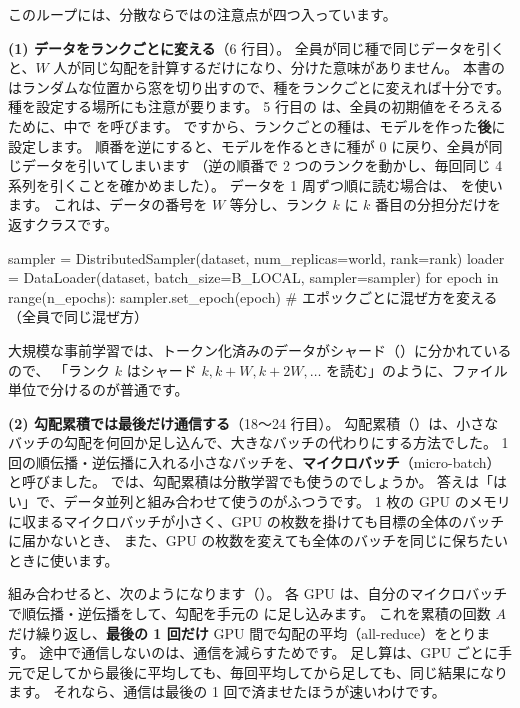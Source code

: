 このループには、分散ならではの注意点が四つ入っています。

\textbf{(1) データをランクごとに変える}（6 行目）。
全員が同じ種で同じデータを引くと、$W$ 人が同じ勾配を計算するだけになり、分けた意味がありません。
本書の  はランダムな位置から窓を切り出すので、種をランクごとに変えれば十分です。
種を設定する場所にも注意が要ります。
5 行目の  は、全員の初期値をそろえるために、中で  を呼びます。
ですから、ランクごとの種は、モデルを作った\textbf{後}に設定します。
順番を逆にすると、モデルを作るときに種が 0 に戻り、全員が同じデータを引いてしまいます
（逆の順番で 2 つのランクを動かし、毎回同じ 4 系列を引くことを確かめました）。
データを 1 周ずつ順に読む場合は、 を使います。
これは、データの番号を $W$ 等分し、ランク $k$ に $k$ 番目の分担分だけを返すクラスです。
\begin{pycode}
sampler = DistributedSampler(dataset, num_replicas=world, rank=rank)
loader = DataLoader(dataset, batch_size=B_LOCAL, sampler=sampler)
for epoch in range(n_epochs):
    sampler.set_epoch(epoch)   # エポックごとに混ぜ方を変える（全員で同じ混ぜ方）
\end{pycode}
大規模な事前学習では、トークン化済みのデータがシャード（）に分かれているので、
「ランク $k$ はシャード $k, k+W, k+2W,\dots$ を読む」のように、ファイル単位で分けるのが普通です。

\textbf{(2) 勾配累積では最後だけ通信する}（18〜24 行目）。
勾配累積（）は、小さなバッチの勾配を何回か足し込んで、大きなバッチの代わりにする方法でした。
1 回の順伝播・逆伝播に入れる小さなバッチを、\textbf{マイクロバッチ}（micro-batch）と呼びました。
では、勾配累積は分散学習でも使うのでしょうか。
答えは「はい」で、データ並列と組み合わせて使うのがふつうです。
1 枚の GPU のメモリに収まるマイクロバッチが小さく、GPU の枚数を掛けても目標の全体のバッチに届かないとき、
また、GPU の枚数を変えても全体のバッチを同じに保ちたいときに使います。

組み合わせると、次のようになります（）。
各 GPU は、自分のマイクロバッチで順伝播・逆伝播をして、勾配を手元の  に足し込みます。
これを累積の回数 $A$ だけ繰り返し、\textbf{最後の 1 回だけ} GPU 間で勾配の平均（all-reduce）をとります。
途中で通信しないのは、通信を減らすためです。
足し算は、GPU ごとに手元で足してから最後に平均しても、毎回平均してから足しても、同じ結果になります。
それなら、通信は最後の 1 回で済ませたほうが速いわけです。

